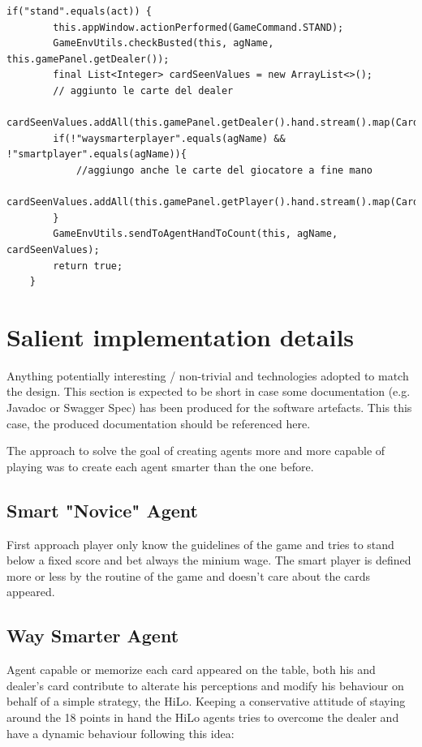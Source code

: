 \begin{lstlisting}[style=java, caption=Java implementation of different behaviour based on specifc agent, label=lst:java_stand_action]
    if("stand".equals(act)) {
        this.appWindow.actionPerformed(GameCommand.STAND);
        GameEnvUtils.checkBusted(this, agName, this.gamePanel.getDealer());
        final List<Integer> cardSeenValues = new ArrayList<>();
        // aggiunto le carte del dealer
        cardSeenValues.addAll(this.gamePanel.getDealer().hand.stream().map(Card::getValue).collect(Collectors.toList()));
        if(!"waysmarterplayer".equals(agName) && !"smartplayer".equals(agName)){
            //aggiungo anche le carte del giocatore a fine mano
            cardSeenValues.addAll(this.gamePanel.getPlayer().hand.stream().map(Card::getValue).collect(Collectors.toList()));
        }
        GameEnvUtils.sendToAgentHandToCount(this, agName, cardSeenValues);
        return true;
    }
\end{lstlisting}


\chapter{Salient implementation details}
Anything potentially interesting / non-trivial and technologies adopted to match the
design. This section is expected to be short in case some documentation (e.g. Javadoc
or Swagger Spec) has been produced for the software artefacts. This this case, the
produced documentation should be referenced here.

The approach to solve the goal of creating agents more and more capable of playing was to create each agent smarter than the one before.

\section{Smart "Novice" Agent}
First approach player only know the guidelines of the game and tries to stand below a fixed score and bet always the minium wage. The smart player is defined more or less by the routine of the game and doesn't care about the cards appeared.

\section{Way Smarter Agent}
Agent capable or memorize each card appeared on the table, both his and dealer's card contribute to alterate his perceptions and modify his behaviour on behalf of a simple strategy, the HiLo.
Keeping a conservative attitude of staying around the 18 points in hand the HiLo agents tries to overcome the dealer and have a dynamic behaviour following this idea:

